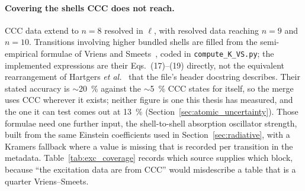 \paragraph{Covering the shells CCC does not reach.} CCC data extend to $n=8$
resolved in $\ell$, with resolved data reaching $n=9$ and $n=10$. Transitions
involving higher bundled shells are filled from the semi-empirical formulae of
Vriens and Smeets~\cite{VriensSmeets1980}, coded in \texttt{compute\_K\_VS.py};
the implemented expressions are their Eqs.~(17)--(19) directly, not the
equivalent rearrangement of Hartgers \emph{et al.}~\cite{Hartgers2001} that the
file's header docstring describes. Their stated accuracy is $\sim$\SI{20}{\percent} against the
$\sim$\SI{5}{\percent} CCC states for itself, so the merge uses CCC wherever it
exists; neither figure is one this thesis has measured, and the one it can test
comes out at \SI{13}{\percent} (Section~\ref{sec:atomic_uncertainty}). Those formulae need one further input, the shell-to-shell absorption
oscillator strength, built from the same Einstein coefficients used in
Section~\ref{sec:radiative}, with a Kramers fallback where a value is missing
that is recorded per transition in the metadata.
Table~\ref{tab:exc_coverage} records which source supplies which block, because
``the excitation data are from CCC'' would misdescribe a table that is a quarter
Vriens--Smeets.


